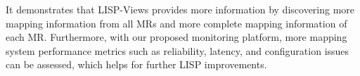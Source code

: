 It demonstrates that LISP-Views provides more information by discovering more mapping information from all MRs and more complete mapping information of each MR. Furthermore, with our proposed monitoring platform, more mapping system performance metrics such as reliability, latency, and configuration issues can be assessed, which helps for further LISP improvements.